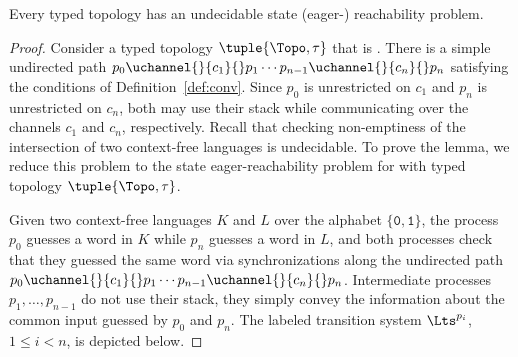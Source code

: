 \documentclass{LMCS}
\newenvironment{proposition}{\begin{prop}}{\end{prop}}
\begin{document}
\begin{proposition}
  Every \converging typed topology has an undecidable \rqcp
  state (eager-) reachability problem. 
\end{proposition}
\begin{proof}
  Consider a typed topology $\tuple{\Topo,\tau}$ that is \converging.  There
  is a simple undirected path $p_0 \uchannel{}{c_1}{} p_1
  \cdots p_{n-1} \uchannel{}{c_n}{} p_n$
  satisfying the conditions of Definition~\ref{def:conv}.
  Since $p_0$ is unrestricted on $c_1$ and $p_n$ is
  unrestricted on $c_n$, both may use their stack while communicating
  over the channels $c_1$ and $c_n$, respectively. 
  Recall that checking non-emptiness of the intersection of two context-free languages is undecidable.
  To prove the lemma, we reduce this problem to the state
  eager-reachability problem for \rqcp with typed topology $\tuple{\Topo,\tau}$.

  Given two context-free languages $K$ and $L$ over the alphabet
  $\{\mathtt{0}, \mathtt{1}\}$, the process $p_0$ guesses a word in
  $K$ while $p_n$ guesses a word in $L$, and both processes check that
  they guessed the same word via synchronizations along the undirected path $p_0
  \uchannel{}{c_1}{} p_1 \cdots p_{n-1} \uchannel{}{c_n}{} p_n$. 
  Intermediate processes $p_1, \ldots, p_{n-1}$ do not use their
  stack, they simply convey the information about the common input
  guessed by $p_0$ and $p_n$.  The labeled transition system
  $\Lts^{p_i}$, $1 \leq i < n$, is depicted below.


\end{proof}
\end{document}
